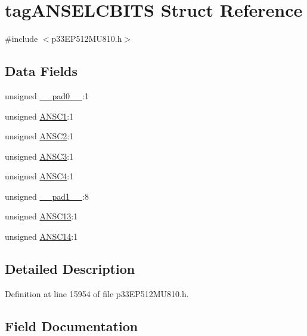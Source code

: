 \hypertarget{structtag_a_n_s_e_l_c_b_i_t_s}{}\section{tag\+A\+N\+S\+E\+L\+C\+B\+I\+TS Struct Reference}
\label{structtag_a_n_s_e_l_c_b_i_t_s}


{\ttfamily \#include $<$p33\+E\+P512\+M\+U810.\+h$>$}

\subsection*{Data Fields}
\begin{DoxyCompactItemize}
\item 
unsigned \hyperlink{structtag_a_n_s_e_l_c_b_i_t_s_adf71f3d8410c1f1dbbc96680a92c49af}{\+\_\+\+\_\+pad0\+\_\+\+\_\+}\+:1
\item 
unsigned \hyperlink{structtag_a_n_s_e_l_c_b_i_t_s_a409660314e9d8509c0eb7d707ca41e6f}{A\+N\+S\+C1}\+:1
\item 
unsigned \hyperlink{structtag_a_n_s_e_l_c_b_i_t_s_af2f06eb3164e2f3b5c9173c38f8c1ad8}{A\+N\+S\+C2}\+:1
\item 
unsigned \hyperlink{structtag_a_n_s_e_l_c_b_i_t_s_a007dd57d7e2d12c32f8a6342d1020512}{A\+N\+S\+C3}\+:1
\item 
unsigned \hyperlink{structtag_a_n_s_e_l_c_b_i_t_s_a6b63d6d642fdf8137fff78592ce11e70}{A\+N\+S\+C4}\+:1
\item 
unsigned \hyperlink{structtag_a_n_s_e_l_c_b_i_t_s_acaf2d0924a107ec6e8d2e31febaf66f9}{\+\_\+\+\_\+pad1\+\_\+\+\_\+}\+:8
\item 
unsigned \hyperlink{structtag_a_n_s_e_l_c_b_i_t_s_ad9dd65666472e326ae8982559430cf4b}{A\+N\+S\+C13}\+:1
\item 
unsigned \hyperlink{structtag_a_n_s_e_l_c_b_i_t_s_a43af47d396f804beba0019a32bc395ad}{A\+N\+S\+C14}\+:1
\end{DoxyCompactItemize}


\subsection{Detailed Description}


Definition at line 15954 of file p33\+E\+P512\+M\+U810.\+h.



\subsection{Field Documentation}
\mbox{\label{structtag_a_n_s_e_l_c_b_i_t_s_adf71f3d8410c1f1dbbc96680a92c49af}} 

